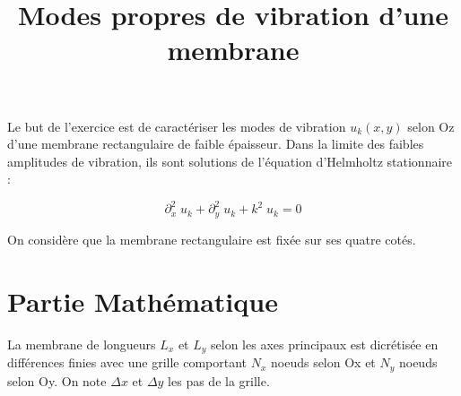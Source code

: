 \documentclass[a4paper, 12pt]{article}
\begin{document}


\title{Modes propres de vibration d'une membrane}

\date{\vspace{-10ex}}
 
\maketitle

 
Le but de l'exercice est de caractériser les modes de vibration $u_k(x,y)$ selon Oz d'une membrane
rectangulaire de faible épaisseur. Dans la limite des faibles amplitudes de vibration, 
ils sont solutions de l'équation d'Helmholtz stationnaire :

\begin{equation}
\partial_x^2 \; u_k + \partial_y^2 \; u_k + k^2 \; u_k=0
\label{Helm}
\end{equation}

On considère que la membrane rectangulaire est fixée sur ses quatre cotés.


\section{Partie Mathématique}

La membrane de longueurs $L_x$ et $L_y$ selon les axes principaux est dicrétisée en différences finies
avec une grille comportant $N_x$ noeuds selon Ox et $N_y$ noeuds selon Oy. On note $\Delta x$ et
$\Delta y$ les pas de la grille.
\end{document}
